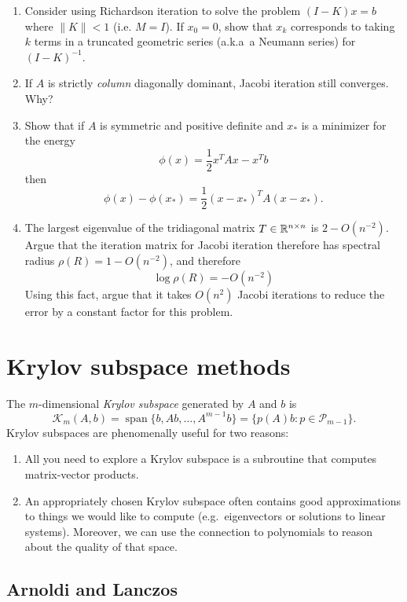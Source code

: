 \documentclass[12pt, leqno]{article}
\newcommand{\calK}{\mathcal{K}}
\newcommand{\calP}{\mathcal{P}}
\begin{document}
\begin{enumerate}
\item
  Consider using Richardson iteration to solve the problem
  $(I-K) x = b$ where $\|K\| < 1$ (i.e. $M = I$).  If $x_0 = 0$,
  show that $x_k$ corresponds to taking $k$ terms in a truncated
  geometric series (a.k.a~a Neumann series) for $(I-K)^{-1}$.
\item
  If $A$ is strictly {\em column} diagonally dominant, Jacobi
  iteration still converges.  Why?
\item
  Show that if $A$ is symmetric and positive definite and
  $x_*$ is a minimizer for the energy
  \[
    \phi(x) = \frac{1}{2} x^T A x - x^T b
  \]
  then
  \[
    \phi(x)-\phi(x_*) = \frac{1}{2} (x-x_*)^T A (x-x_*).
  \]
\item
  The largest eigenvalue of the tridiagonal matrix
  $T \in \mathbb{R}^{n \times n}$ is $2 - O(n^{-2})$.
  Argue that the iteration matrix for Jacobi iteration therefore
  has spectral radius $\rho(R) = 1-O(n^{-2})$, and therefore
  \[
    \log \rho(R) = -O(n^{-2})
  \]
  Using this fact, argue that it takes $O(n^2)$ Jacobi iterations
  to reduce the error by a constant factor for this problem.
\end{enumerate}

\section{Krylov subspace methods}

The $m$-dimensional {\em Krylov subspace} generated by $A$ and $b$ is
\[
  \calK_m(A,b)
    = \operatorname{span}\{ b, Ab, \ldots, A^{m-1} b \}
    = \{ p(A) b : p \in \calP_{m-1} \}.
\]
Krylov subspaces are phenomenally useful for two reasons:
\begin{enumerate}
\item
  All you need to explore a Krylov subspace is a subroutine
  that computes matrix-vector products.
\item
  An appropriately chosen Krylov subspace often contains good
  approximations to things we would like to compute (e.g.~eigenvectors
  or solutions to linear systems).  Moreover, we can use the
  connection to polynomials to reason about the quality of that space.
\end{enumerate}

\subsection{Arnoldi and Lanczos}
\end{document}

